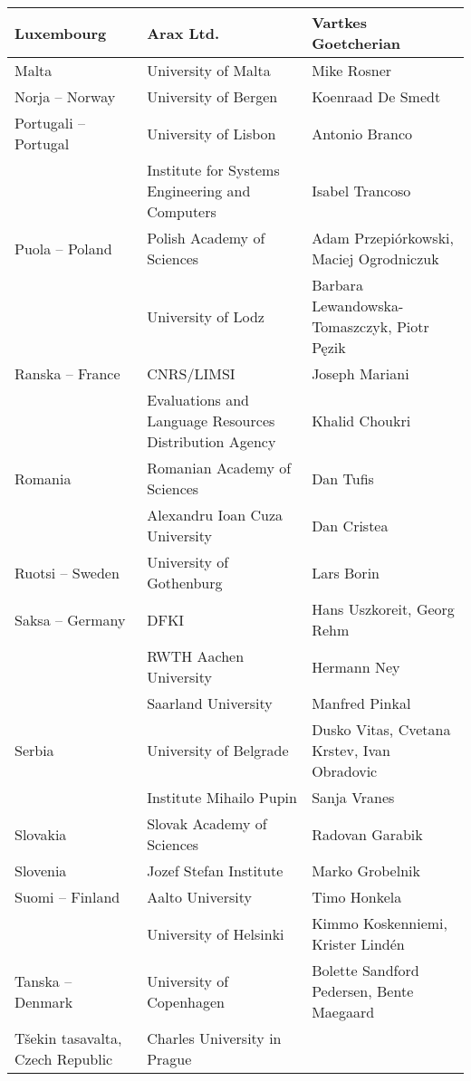 \documentclass[]{../../metanetpaper}
\begin{document}
\begin{Parallel}[c]{70mm}{70mm}
\begin{longtable}{p{3.5cm}|p{5.5cm}|p{5cm}}
 \\ \hline
 Luxembourg
 &  Arax Ltd.
 &  Vartkes Goetcherian
 \\ \hline
 Malta
 &  University of Malta
 &  Mike Rosner
 \\ \hline
 Norja -- Norway
 &  University of Bergen
 &  Koenraad De Smedt
 \\ \hline
 Portugali -- Portugal
 &  University of Lisbon
 &  Antonio Branco
 \\
 &  Institute for Systems      
    Engineering and Computers
 &  Isabel Trancoso
 \\ \hline
 Puola -- Poland
 &  Polish Academy of Sciences
 &  Adam Przepiórkowski,
    Maciej Ogrodniczuk
 \\
 &  University of Lodz
 &  Barbara Lewandowska-Tomaszczyk,
    Piotr Pęzik
 \\ \hline
 Ranska -- France
 &  CNRS/LIMSI
 &  Joseph Mariani
 \\
 &  \raggedright Evaluations and Language
    Resources Distribution Agency
 &  Khalid Choukri \\ \hline
 Romania
 &  Romanian Academy of Sciences
 &  Dan Tufis
 \\
 &  Alexandru Ioan Cuza University
 &  Dan Cristea
 \\ \hline
 Ruotsi -- Sweden
 &  University of Gothenburg
 &  Lars Borin
 \\ \hline
 Saksa -- Germany
 &  DFKI
 &  Hans Uszkoreit, Georg Rehm
 \\
 & RWTH Aachen University
 & Hermann Ney
 \\
 & Saarland University
 & Manfred Pinkal
 \\ \hline
 Serbia
 &  University of Belgrade
 &  Dusko Vitas,
    Cvetana Krstev,
    Ivan Obradovic
 \\
 &  Institute Mihailo Pupin
 &  Sanja Vranes
 \\ \hline
 Slovakia 
 &  Slovak Academy of Sciences
 &  Radovan Garabik
 \\ \hline
 Slovenia
 &  Jozef Stefan Institute
 &  Marko Grobelnik
 \\ \hline
 Suomi -- Finland
 & Aalto University
 & Timo Honkela
 \\
 & University of Helsinki
 & Kimmo Koskenniemi,
   Krister Lindén
 \\ \hline
 Tanska -- Denmark
 &  University of Copenhagen
 &  Bolette Sandford Pedersen,
    Bente Maegaard
 \\ \hline
 \raggedright
 Tšekin tasavalta, Czech Republic
 &  Charles University in Prague

\end{longtable}
\end{Parallel}
\end{document}
